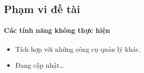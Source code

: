 \subsection{Phạm vi đề tài}
\paragraph{Các tính năng không thực hiện}
\begin{itemize}
    \item Tích hợp với những công cụ quản lý khác.
    \item Đang cập nhật\dots
\end{itemize}